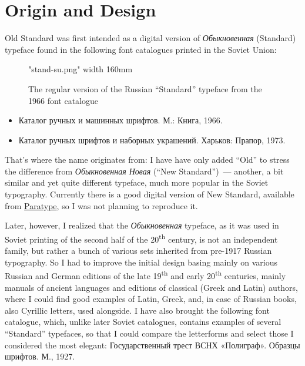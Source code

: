 \documentclass[12pt,a4paper,openany]{book}
\begin{document}
\section{Origin and Design}

Old Standard was first intended as a digital version of
\textit{Обыкновенная} (Standard) typeface found in the following font
catalogues printed in the Soviet Union: 

\begin{figure}

\centerline{\XeTeXpicfile "stand-su.png" width 160mm}

\caption{The regular version of the Russian “Standard” typeface from the
1966 font catalogue}

\label{fig:stand-su}

\end{figure}

\begin{otherlanguage}{russian}

\begin{itemize}

\item Каталог ручных и машинных шрифтов. М.: Книга, 1966.

\item Каталог ручных шрифтов и наборных украшений. Харьков: Прапор, 1973.

\end{itemize}

\end{otherlanguage}

That’s where the name originates from: I have have only added “Old” to
stress the difference from \textit{Обыкновенная Новая} (“New Standard”)~—
another, a bit similar and yet quite different typeface, much more
popular in the Soviet typography. Currently there is a good digital version
of New Standard, available from \href{http://www.paratype.ru}{Paratype},
so I was not planning to reproduce it.

Later, however, I realized that the \textit{Обыкновенная} typeface, as it
was used in Soviet printing of the second half of the
20\textsuperscript{th} century, is not an independent family, but rather a
bunch of various sets inherited from pre-1917 Russian typography. So I had
to improve the initial design basing mainly on various Russian and German
editions of the late 19\textsuperscript{th} and early
20\textsuperscript{th} centuries, mainly manuals of ancient languages and
editions of classical (Greek and Latin) authors, where I could find good
examples of Latin, Greek, and, in case of Russian books, also Cyrillic
letters, used alongside. I have also brought the following font catalogue,
which, unlike later Soviet catalogues, contains examples of several
“Standard” typefaces, so that I could compare the letterforms and select
those I considered the most elegant:
\foreignlanguage{russian}{Государственный трест ВСНХ «Полиграф». Образцы
шрифтов. М., 1927}.
\end{document}
